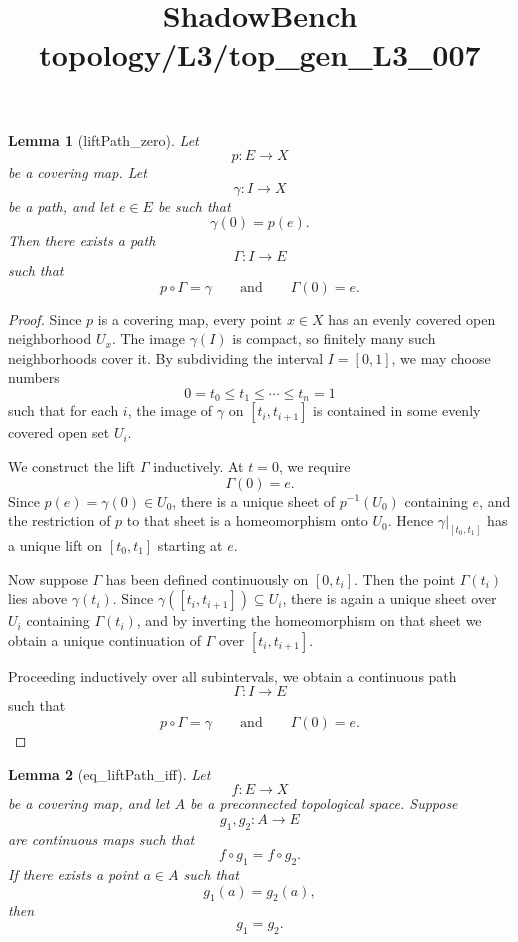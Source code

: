 \documentclass{article}
\title{ShadowBench topology/L3/top\_gen\_L3\_007}
\newtheorem{lemma}{Lemma}
\begin{document}
\maketitle

\begin{lemma}[liftPath_zero]
Let
\[
p:E\to X
\]
be a covering map. Let
\[
\gamma:I\to X
\]
be a path, and let \(e\in E\) be such that
\[
\gamma(0)=p(e).
\]
Then there exists a path
\[
\Gamma:I\to E
\]
such that
\[
p\circ \Gamma=\gamma
\qquad\text{and}\qquad
\Gamma(0)=e.
\]
\end{lemma}

\begin{proof}
Since \(p\) is a covering map, every point \(x\in X\) has an evenly covered open neighborhood \(U_x\). The image \(\gamma(I)\) is compact, so finitely many such neighborhoods cover it. By subdividing the interval \(I=[0,1]\), we may choose numbers
\[
0=t_0\le t_1\le \cdots \le t_n=1
\]
such that for each \(i\), the image of \(\gamma\) on \([t_i,t_{i+1}]\) is contained in some evenly covered open set \(U_i\).

We construct the lift \(\Gamma\) inductively. At \(t=0\), we require
\[
\Gamma(0)=e.
\]
Since \(p(e)=\gamma(0)\in U_0\), there is a unique sheet of \(p^{-1}(U_0)\) containing \(e\), and the restriction of \(p\) to that sheet is a homeomorphism onto \(U_0\). Hence \(\gamma|_{[t_0,t_1]}\) has a unique lift on \([t_0,t_1]\) starting at \(e\).

Now suppose \(\Gamma\) has been defined continuously on \([0,t_i]\). Then the point \(\Gamma(t_i)\) lies above \(\gamma(t_i)\). Since \(\gamma([t_i,t_{i+1}])\subseteq U_i\), there is again a unique sheet over \(U_i\) containing \(\Gamma(t_i)\), and by inverting the homeomorphism on that sheet we obtain a unique continuation of \(\Gamma\) over \([t_i,t_{i+1}]\).

Proceeding inductively over all subintervals, we obtain a continuous path
\[
\Gamma:I\to E
\]
such that
\[
p\circ \Gamma=\gamma
\qquad\text{and}\qquad
\Gamma(0)=e.
\]
\end{proof}


\begin{lemma}[eq_liftPath_iff]
Let
\[
f:E\to X
\]
be a covering map, and let \(A\) be a preconnected topological space. Suppose
\[
g_1,g_2:A\to E
\]
are continuous maps such that
\[
f\circ g_1=f\circ g_2.
\]
If there exists a point \(a\in A\) such that
\[
g_1(a)=g_2(a),
\]
then
\[
g_1=g_2.
\]
\end{lemma}
\end{document}

